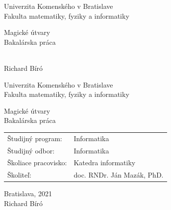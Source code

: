 \documentclass[12pt, oneside]{book}  %
\def\mfrok{2021}
\def\mfnazov{Magické útvary}
\def\mftyp{Bakalárska práca}
\def\mfautor{Richard Bíró}
\def\mfskolitel{doc. RNDr. Ján Mazák, PhD.}
\def\mfkonzultant{tit. Meno Priezvisko, tit. }
\def\mfmiesto{Bratislava, \mfrok}
\def\mfodbor{ Informatika}
\def\program{ Informatika }
\def\mfpracovisko{ Katedra informatiky }
\begin{document}
     
\frontmatter


\thispagestyle{empty}

\begin{center}
\sc\large
Univerzita Komenského v Bratislave\\
Fakulta matematiky, fyziky a informatiky

\vfill

{\LARGE\mfnazov}\\
\mftyp
\end{center}

\vfill

{\sc\large 
\noindent \mfrok\\
\mfautor
}

\cleardoublepage


\thispagestyle{empty}
\noindent

\begin{center}
\sc  
\large
Univerzita Komenského v Bratislave\\
Fakulta matematiky, fyziky a informatiky

\vfill

{\LARGE\mfnazov}\\
\mftyp
\end{center}

\vfill

\noindent
\begin{tabular}{ll}
Študijný program: & \program \\
Študijný odbor: & \mfodbor \\
Školiace pracovisko: & \mfpracovisko \\
Školiteľ: & \mfskolitel \\
\end{tabular}

\vfill


\noindent \mfmiesto\\
\mfautor

\cleardoublepage


\end{document}

